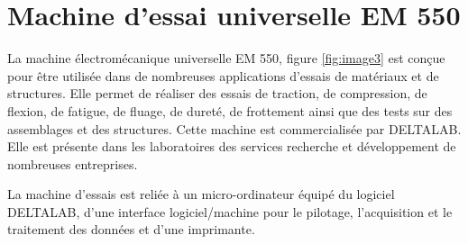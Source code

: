 

\section{Machine d'essai universelle EM 550}

La machine électromécanique universelle EM 550, figure \ref{fig:image3} est conçue pour être utilisée dans de nombreuses applications d'essais de matériaux et de structures. Elle permet de réaliser des essais de traction, de compression, de flexion, de fatigue, de fluage, de dureté, de frottement ainsi que des tests sur des assemblages et des structures. Cette machine est commercialisée par DELTALAB. Elle est présente dans les laboratoires des services recherche et développement de nombreuses entreprises.

La machine d'essais est reliée à un micro-ordinateur équipé du logiciel DELTALAB, d'une interface logiciel/machine pour le pilotage, l'acquisition et le traitement des données et d'une imprimante.

